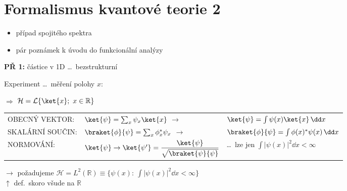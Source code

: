 \documentclass[11pt,a4paper]{article}
\begin{document}
\section{Formalismus kvantové teorie 2}
\begin{itemize}[nosep]
  \item[--] případ spojitého spektra
  \item[--] pár poznámek k úvodu do funkcionální analýzy
\end{itemize}

\begin{minipage}{0.5\textwidth}
\textbf{PŘ 1:} částice v 1D \dots\ bezstrukturní

Experiment \dots\ měření polohy $x$:

\bigskip
\quad $\Rightarrow$ \quad $\mathcal{H} = \mathcal{L}\{\ket{x};\ x\in\mathbb{R}\}$
\end{minipage}
\begin{minipage}{0.48\textwidth}
\end{minipage}

\begin{tabular}{@{}lll}
OBECNÝ VEKTOR: & $\ket{\psi} = \sum_x\psi_x\ket{x}$ \quad $\longrightarrow$ & $\ket{\psi} = \int\psi(x)\ket{x}\,\dd x$ \\[3pt]
SKALÁRNÍ SOUČIN: & $\braket{\phi}{\psi} = \sum_x\phi_x^*\psi_x$ \quad $\longrightarrow$ & $\braket{\phi}{\psi} = \int\phi(x)^*\psi(x)\,\dd x$ \\[3pt]
NORMOVÁNÍ: & $\ket{\psi}\to\ket{\psi'} = \dfrac{\ket{\psi}}{\sqrt{\braket{\psi}{\psi}}}$ & \dots\ lze jen $\int|\psi(x)|^2\dd x < \infty$
\end{tabular}

$\to$ požadujeme \quad $\mathcal{H} = L^2(\mathbb{R}) \equiv \big\{\psi(x):\ \int|\psi(x)|^2\dd x < \infty\big\}$ \\
\hspace*{5.3cm} $\uparrow$ def.\ skoro všude na $\mathbb{R}$
\end{document}
